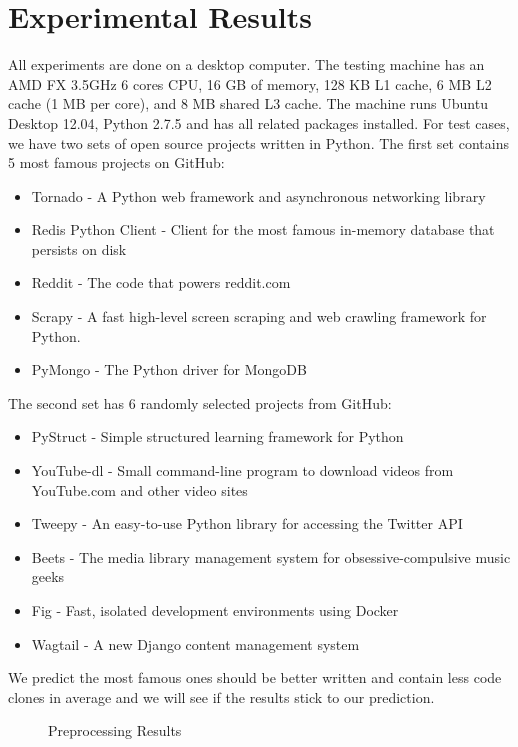 \documentclass{acm_proc_article-sp}
\begin{document}
\section{Experimental Results}
All experiments are done on a desktop computer. The testing machine has an AMD FX 3.5GHz 6 cores CPU, 16 GB of memory,
128 KB L1 cache, 6 MB L2 cache (1 MB per core), and 8 MB shared L3 cache. The machine runs Ubuntu Desktop 12.04, Python
2.7.5 and has all related packages installed.
For test cases, we have two sets of open source projects written in Python. The first set contains 5 most famous projects on GitHub:
\begin{itemize}
\item Tornado - A Python web framework and asynchronous networking library
\item Redis Python Client - Client for the most famous in-memory database that persists on disk
\item Reddit - The code that powers reddit.com
\item Scrapy - A fast high-level screen scraping and web crawling framework for Python.
\item PyMongo - The Python driver for MongoDB
\end{itemize} 

The second set has 6 randomly selected projects from GitHub:
\begin{itemize}
\item PyStruct - Simple structured learning framework for Python
\item YouTube-dl - Small command-line program to download videos from YouTube.com and other video sites
\item Tweepy - An easy-to-use Python library for accessing the Twitter API
\item Beets - The media library management system for obsessive-compulsive music geeks
\item Fig - Fast, isolated development environments using Docker
\item Wagtail - A new Django content management system
\end{itemize}

We predict the most famous ones should be better written and contain less code clones in average and we will see if the results stick to our prediction.

\begin{figure}
\centering
{}
\caption{Preprocessing Results}
\end{figure}
\end{document}
